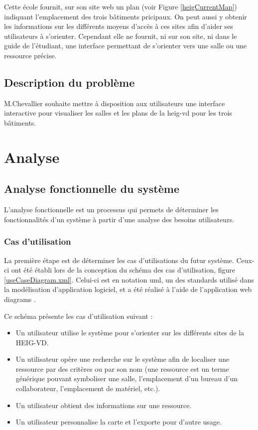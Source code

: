 \documentclass[
    iai, %
    il, %
]{heig-tb}
\begin{document}
Cette école fournit, sur son site web un plan \cite{plan-heig} (voir Figure \ref{heigCurrentMap}) indiquant l'emplacement des trois bâtiments pricipaux.
On peut aussi y obtenir les informations sur les différents moyens d'accès à ces sites afin d'aider ses utilisateurs à s'orienter.
Cependant elle ne fournit, ni sur son site, ni dans le guide de l'étudiant, une interface permettant de s'orienter vers une salle ou une ressource précise.

\section{Description du problème}
M.Chevallier souhaite mettre à disposition aux utilisateurs une interface interactive pour visualiser les salles et les plans de la \gls{heig-vd} pour les trois bâtiments.

\chapter{Analyse}
\section{Analyse fonctionnelle du système}
L'analyse fonctionnelle est un processus qui permets de déterminer les fonctionnalités d'un système à partir d'une analyse des besoins utilisateurs.

\subsection{Cas d'utilisation}
La première étape est de déterminer les cas d'utilisations du futur système.
Ceux-ci ont été établi lors de la conception du schéma des cas d'utilisation, figure \ref{useCaseDiagram.xml}.
Celui-ci est en notation \gls{uml}, un des standards utilisé dans la modélisation d'application logiciel,
et a été réalisé à l'aide de l'application web \gls{diagrams} \cite{diagrams}.


\newpage
Ce schéma présente les cas d'utilisation suivant :
\begin{itemize}
    \item Un utilisateur utilise le système pour s'orienter sur les différents sites de la HEIG-VD.
    \item Un utilisateur opère une recherche sur le système afin de localiser une ressource par des critères ou par son nom (une ressource est un terme générique pouvant symboliser une salle, l'emplacement d'un bureau d'un collaborateur, l'emplacement de matériel, etc.).
    \item Un utilisateur obtient des informations sur une ressource.
    \item Un utilisateur personnalise la carte et l'exporte pour d'autre usage.
\end{itemize}
\end{document}
